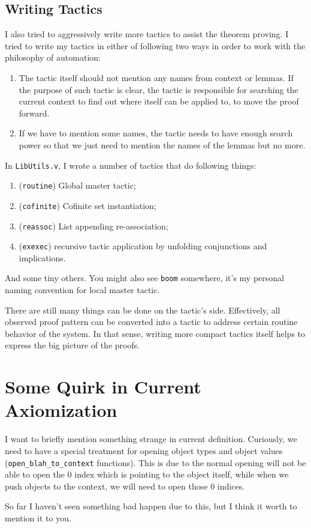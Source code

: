\documentclass{article}
\theoremstyle{definition}
\begin{document}
\subsection{Writing Tactics}

I also tried to aggressively write more tactics to assist the theorem proving. I tried
to write my tactics in either of following two ways in order to work with the
philosophy of automation:

\begin{enumerate}
\item The tactic itself should not mention any names from context or lemmas. If the
  purpose of such tactic is clear, the tactic is responsible for searching the
  current context to find out where itself can be applied to, to move the proof
  forward.
  
\item If we have to mention some names, the tactic needs to have enough search power
  so that we just need to mention the names of the lemmas but no more.
\end{enumerate}

In \texttt{LibUtils.v}, I wrote a number of tactics that do following things:
\begin{enumerate}
\item (\texttt{routine}) Global master tactic;
\item (\texttt{cofinite}) Cofinite set instantiation;
\item (\texttt{reassoc}) List appending re-association;
\item (\texttt{exexec}) recursive tactic application by unfolding conjunctions and
  implications.
\end{enumerate}

And some tiny others. You might also see \texttt{boom} somewhere, it's my personal
naming convention for local master tactic.

There are still many things can be done on the tactic's side. Effectively, all
observed proof pattern can be converted into a tactic to address certain routine
behavior of the system. In that sense, writing more compact tactics itself helps to
express the big picture of the proofs. 

\section{Some Quirk in Current Axiomization}

I want to briefly mention something strange in current definition. Curiously, we need
to have a special treatment for opening object types and object values
(\texttt{open\_blah\_to\_context} functions). This is due to the normal opening will
not be able to open the 0 index which is pointing to the object itself, while when we
push objects to the context, we will need to open those 0 indices.

So far I haven't seen something bad happen due to this, but I think it worth to
mention it to you.

\printbibliography
\end{document}
